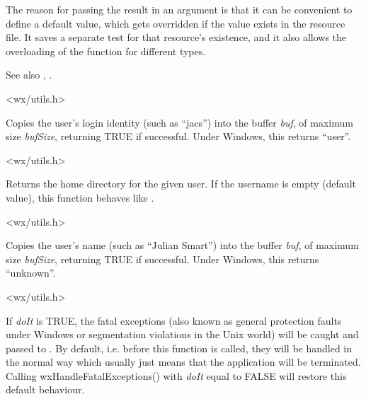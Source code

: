 The reason for passing the result in an argument is that it
can be convenient to define a default value, which gets overridden
if the value exists in the resource file. It saves a separate
test for that resource's existence, and it also allows
the overloading of the function for different types.

See also , .


<wx/utils.h>



Copies the user's login identity (such as ``jacs'') into the buffer {\it
buf}, of maximum size {\it bufSize}, returning TRUE if successful.
Under Windows, this returns ``user''.


<wx/utils.h>

\label{wxgetuserhome}


Returns the home directory for the given user. If the username is empty
(default value), this function behaves like
.


<wx/utils.h>



Copies the user's name (such as ``Julian Smart'') into the buffer {\it
buf}, of maximum size {\it bufSize}, returning TRUE if successful.
Under Windows, this returns ``unknown''.


<wx/utils.h>

\label{wxhandlefatalexceptions}


If {\it doIt} is TRUE, the fatal exceptions (also known as general protection
faults under Windows or segmentation violations in the Unix world) will be
caught and passed to .
By default, i.e. before this function is called, they will be handled in the
normal way which usually just means that the application will be terminated.
Calling wxHandleFatalExceptions() with {\it doIt} equal to FALSE will restore
this default behaviour.

